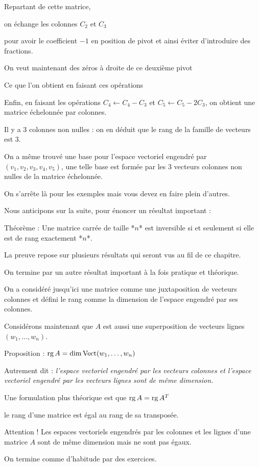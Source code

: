 Repartant de cette matrice, 

\change
\change
on échange les colonnes $C_2$ et $C_3$ 

pour avoir le coefficient $-1$ en position de pivot et ainsi 
éviter d'introduire des fractions. 


On veut maintenant des zéros à droite de ce deuxième pivot

\change
Ce que l'on obtient en faisant ces opérations 

\change
Enfin, en faisant les opérations $C_4\leftarrow C_4-C_3$
et $C_5\leftarrow C_5-2C_3$, on obtient une matrice échelonnée par colonnes.

\change
Il y a $3$ colonnes non nulles : on en déduit que le rang de 
la famille de vecteurs est $3$.

\change
On a même trouvé une base pour l'espace vectoriel engendré par 
$(v_1,v_2,v_3,v_4,v_5)$,
une telle base est formée par les $3$ vecteurs colonnes 
non nulles de la matrice échelonnée.


On s'arrête là pour les exemples mais vous devez en faire plein d'autres.


\diapo

Nous anticipons sur la suite, pour énoncer un résultat important :

Théorème : Une matrice carrée de taille *$n$* est inversible si et seulement si elle
est de rang exactement *$n$*.


La preuve repose sur plusieurs résultats qui seront vus au fil de ce chapitre.


\diapo

On termine par un autre résultat important à la fois pratique et théorique.

On a considéré jusqu'ici une matrice 
comme une juxtaposition de vecteurs colonnes 
et défini le rang comme la dimension de l'espace engendré par 
ses colonnes.

Considérons maintenant que $A$ est aussi une superposition 
de vecteurs lignes $(w_1,\ldots,w_n)$.

\change
Proposition : $\mathop{\text{rg}}\nolimits A = \dim \mathop{\text{Vect}}\nolimits (w_1,\ldots,w_n)$


\change
Autrement dit : \emph{l'espace vectoriel engendré par les vecteurs colonnes
et l'espace vectoriel engendré par les vecteurs lignes sont de même dimension.}

\change
Une formulation plus théorique est que 
$\mathop{\text{rg}}\nolimits A = \mathop{\text{rg}}\nolimits A^T$

\change
le rang d'une matrice est égal au rang de sa transposée.


Attention ! Les espaces vectoriels engendrés par les colonnes
et les lignes d'une matrice $A$ sont de même dimension mais ne sont pas égaux.


\diapo

On termine comme d'habitude par des exercices.


